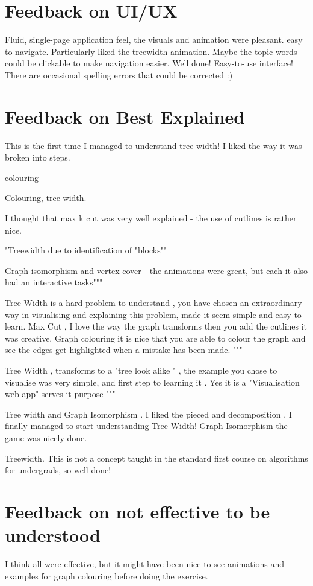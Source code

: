 \section{Feedback on UI/UX}
Fluid, single-page application feel, 
the visuals and animation were pleasant. easy to navigate.
Particularly liked the treewidth animation.
Maybe the topic words could be clickable to make navigation easier.
Well done! Easy-to-use interface! There are occasional spelling errors that
   could be corrected :)



\section{Feedback on Best Explained}
This is the first time I managed to understand tree width! I liked the
way it was broken into steps.

colouring

Colouring, tree width.

I thought that max k cut was very well explained - the use of cutlines is rather nice.

"Treewidth due to identification of "blocks""

Graph isomorphism and vertex cover - the animations were great, but
each it also had an interactive tasks"""

Tree Width is a hard problem to understand , you
have chosen an extraordinary way in visualising and explaining this
problem, made it seem simple and easy to learn. 
Max Cut , I love the way
the graph transforms then you add the cutlines it was creative. Graph
colouring it is nice that you are able to colour the graph and see the
edges get highlighted when a mistake has been made.  """

Tree Width ,
transforms to a "tree look alike " , the example you chose to visualise
was very simple, and first step to learning it . Yes it is a
"Visualisation web app" serves it purpose """

Tree width and Graph Isomorphism . I liked the pieced and decomposition .
I finally managed to start understanding Tree Width!  Graph Isomorphism
the game was nicely done.

Treewidth. This is not a concept taught in the standard first course on
algorithms for undergrads, so well done!

\section{Feedback on not effective to be understood}
I think all were effective, but it might have been nice to see animations 
and examples for graph colouring before doing the exercise.

